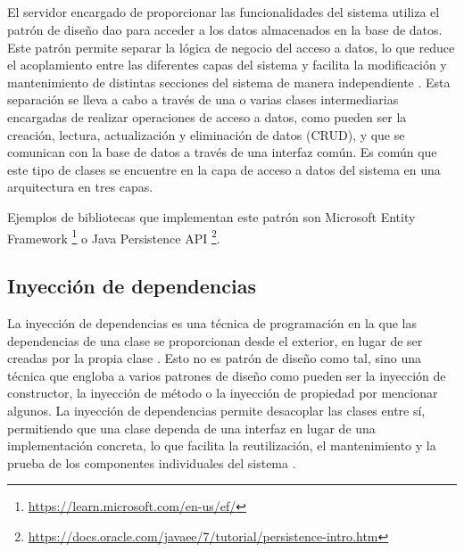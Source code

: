 
\subsection{}
\label{anexo2:sec:dao}
El servidor encargado de proporcionar las funcionalidades del sistema utiliza el
patrón de diseño \gls{dao} para acceder a los datos almacenados en la base de
datos. Este patrón permite separar la lógica de negocio del acceso a datos, lo
que reduce el acoplamiento entre las diferentes capas del sistema y facilita la
modificación y mantenimiento de distintas secciones del sistema de manera
independiente \parencites{DAOJ2EE}{Zato2020Dao}. Esta separación se lleva a
cabo a través de una o varias clases intermediarias encargadas de realizar
operaciones de acceso a datos, como pueden ser la creación, lectura, actualización
y eliminación de datos (CRUD), y que se comunican con la base de datos a través
de una interfaz común. Es común que este tipo de clases se encuentre en la
capa de acceso a datos del sistema en una arquitectura en tres capas.


Ejemplos de bibliotecas que implementan este patrón son Microsoft Entity Framework%
\footnote{\url{https://learn.microsoft.com/en-us/ef/}} o Java Persistence API%
\footnote{\url{https://docs.oracle.com/javaee/7/tutorial/persistence-intro.htm}}.

\subsection{Inyección de dependencias}
\label{anexo2:sec:inyeccion-dependencias}
La inyección de dependencias es una técnica de programación en la que las
dependencias de una clase se proporcionan desde el exterior, en lugar de ser
creadas por la propia clase \parencite{DepInyectionStackOVerflow}. Esto no es
patrón de diseño como tal, sino una técnica que engloba a varios patrones de
diseño como pueden ser la inyección de constructor, la inyección de método o la
inyección de propiedad por mencionar algunos. La inyección de dependencias
permite desacoplar las clases entre sí, permitiendo que una clase dependa de una
interfaz en lugar de una implementación concreta, lo que facilita la
reutilización, el mantenimiento y la prueba de los componentes individuales del
sistema \parencite{Seemann2025Jun}.

